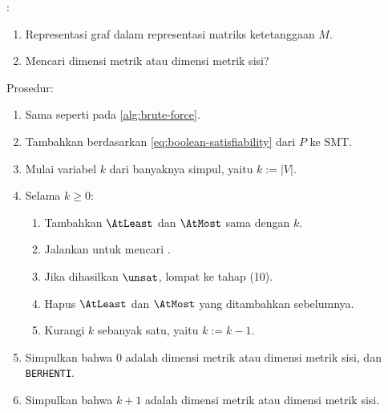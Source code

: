 \begin{algorithm}
	:
	\begin{enumerate}
		\item Representasi graf dalam representasi matriks ketetanggaan \(M\).
		\item Mencari dimensi metrik atau dimensi metrik sisi?
	\end{enumerate}
	Prosedur:
	\begin{enumerate}
		\item[1--5.] Sama seperti pada \autoref{alg:brute-force}.
		\setcounter{enumi}{5}
		\item Tambahkan  berdasarkan \autoref{eq:boolean-satisfiability} dari \(P\) ke  SMT.
		\item Mulai variabel \(k\) dari banyaknya simpul, yaitu \(k := |V|\).
		\item Selama \(k \geq 0\):
			\begin{enumerate}
					\item Tambahkan  \(\AtLeast\) dan \(\AtMost\) sama dengan \(k\).
					\item Jalankan  untuk mencari .
					\item Jika dihasilkan \(\unsat\), lompat ke tahap (10).
					\item Hapus  \(\AtLeast\) dan \(\AtMost\) yang ditambahkan sebelumnya.
					\item Kurangi \(k\) sebanyak satu, yaitu \(k := k - 1\).
			\end{enumerate}
		\item Simpulkan bahwa 0 adalah dimensi metrik atau dimensi metrik sisi, dan \texttt{BERHENTI}.
		\item Simpulkan bahwa \(k + 1\) adalah dimensi metrik atau dimensi metrik sisi.
	\end{enumerate}
	\caption{}
	\label{alg:boolean-satisfiability}
\end{algorithm}
